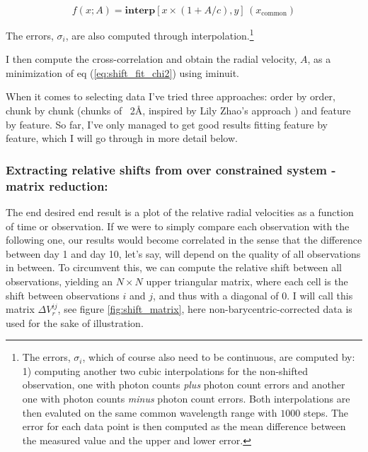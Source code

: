     \begin{equation}
        f(x; A) = \textbf{interp}[x \times ( 1 + A/c), y]\,(x_\text{common})
    \end{equation}

    The errors, $\sigma_i$, are also computed through interpolation.\footnote{The errors, $\sigma_i$, which of course also need to be continuous, are computed by: 1) computing another two cubic interpolations for the non-shifted observation, one with photon counts \emph{plus} photon count errors and another one with photon counts \emph{minus} photon count errors. Both interpolations are then evaluted on the same common wavelength range with $1000$ steps. The error for each data point is then computed as the mean difference between the measured value and the upper and lower error.}
    
    I then compute the cross-correlation and obtain the radial velocity, $A$, as a minimization of eq (\ref{eq:shift_fit_chi2}) using iminuit.

    When it comes to selecting data I've tried three approaches: order by order, chunk by chunk (chunks of ~2Å, inspired by Lily Zhao's approach \cite{first_RV_from_EXPRES}) and feature by feature. So far, I've only managed to get good results fitting feature by feature, which I will go through in more detail below.
    
    \subsubsection{Extracting relative shifts from over constrained system - matrix reduction:}
    
    The end desired end result is a plot of the relative radial velocities as a function of time or observation. If we were to simply compare each observation with the following one, our results would become correlated in the sense that the difference between day 1 and day 10, let's say, will depend on the quality of all observations in between. To circumvent this, we can compute the relative shift between all observations, yielding an $N\times N$ upper triangular matrix, where each cell is the shift between observations $i$ and $j$, and thus with a diagonal of 0. I will call this matrix $\Delta V_r^{ij}$, see figure \ref{fig:shift_matrix}, here non-barycentric-corrected data is used for the sake of illustration. 
    
